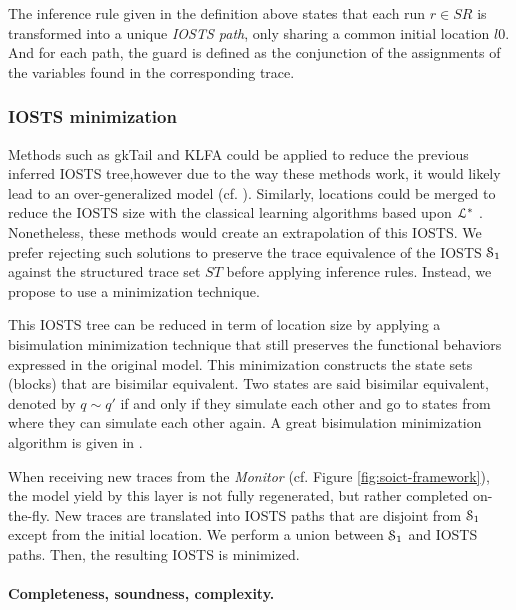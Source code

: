 The inference rule given in the definition above states that each
run $r \in SR$ is transformed into a unique \emph{IOSTS path},
only sharing a common initial location $l0$. And for each path,
the guard is defined as the conjunction of the assignments of the
variables found in the corresponding trace.

\subsubsection{IOSTS minimization}

Methods such as gkTail and KLFA could be applied to reduce the
previous inferred IOSTS tree,however due to the way these
methods work, it would likely lead to an over-generalized model
(cf. ).
Similarly, locations could be merged to reduce the IOSTS size
with the classical learning algorithms based upon
$\EuScript{L}^*$ \cite{Angluin198787,lambeau08}. Nonetheless,
these methods would create an extrapolation of this IOSTS. We
prefer rejecting such solutions to preserve the trace equivalence
\cite{petrenko06} of the IOSTS $\EuScript{S}_1$ against the
structured trace set $ST$ before applying inference rules.
Instead, we propose to use a minimization technique.

This IOSTS tree can be reduced in term of location size by
applying a bisimulation minimization technique
\cite{Park:1981:CAI:647210.720030} that still preserves the
functional behaviors expressed in the original model.  This
minimization constructs the state sets (blocks) that are
bisimilar equivalent. Two states are said bisimilar equivalent,
denoted by $q \sim q'$ if and only if they simulate each other
and go to states from where they can simulate each other again.
A great bisimulation minimization algorithm is given in
\cite{Fernandez89animplementation}.

When receiving new traces from the \emph{Monitor} (cf. Figure
\ref{fig:soict-framework}), the model yield by this layer is not
fully regenerated, but rather completed on-the-fly. New traces
are translated into IOSTS paths that are disjoint from
$\EuScript{S}_1$ except from the initial location. We perform a
union between $\EuScript{S}_1$ and IOSTS paths. Then, the
resulting IOSTS is minimized.

\paragraph{Completeness, soundness, complexity.}


